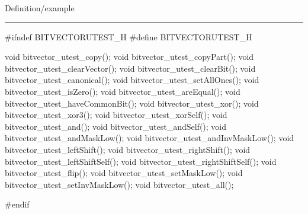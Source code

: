 
Definition/example

\bigskip
\hrule
\code
#ifndef BITVECTORUTEST_H
#define BITVECTORUTEST_H
\endcode

\code
void bitvector_utest_copy();
void bitvector_utest_copyPart();
void bitvector_utest_clearVector();
void bitvector_utest_clearBit();
void bitvector_utest_canonical();
void bitvector_utest_setAllOnes();
void bitvector_utest_isZero();
void bitvector_utest_areEqual();
void bitvector_utest_haveCommonBit();
void bitvector_utest_xor();
void bitvector_utest_xor3();
void bitvector_utest_xorSelf();
void bitvector_utest_and();
void bitvector_utest_andSelf();
void bitvector_utest_andMaskLow();
void bitvector_utest_andInvMaskLow();
void bitvector_utest_leftShift();
void bitvector_utest_rightShift();
void bitvector_utest_leftShiftSelf();
void bitvector_utest_rightShiftSelf();
void bitvector_utest_flip();
void bitvector_utest_setMaskLow();
void bitvector_utest_setInvMaskLow();
void bitvector_utest_all();


#endif
\endcode
